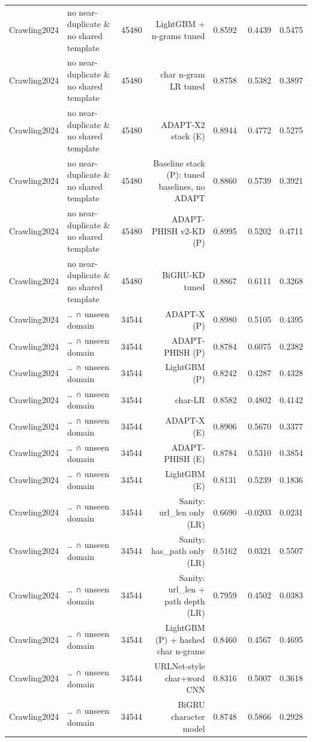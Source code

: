 \begin{table}[t]
\begin{tabular}{llrrrrr}
Crawling2024 & no near-duplicate \& no shared template & 45480 & LightGBM + n-grams tuned & 0.8592 & 0.4439 & 0.5475 \\
Crawling2024 & no near-duplicate \& no shared template & 45480 & char n-gram LR tuned & 0.8758 & 0.5382 & 0.3897 \\
Crawling2024 & no near-duplicate \& no shared template & 45480 & ADAPT-X2 stack (E) & 0.8944 & 0.4772 & 0.5275 \\
Crawling2024 & no near-duplicate \& no shared template & 45480 & Baseline stack (P): tuned baselines, no ADAPT & 0.8860 & 0.5739 & 0.3921 \\
Crawling2024 & no near-duplicate \& no shared template & 45480 & ADAPT-PHISH v2-KD (P) & 0.8995 & 0.5202 & 0.4711 \\
Crawling2024 & no near-duplicate \& no shared template & 45480 & BiGRU-KD tuned & 0.8867 & 0.6111 & 0.3268 \\
Crawling2024 & … ∩ unseen domain & 34544 & ADAPT-X (P) & 0.8980 & 0.5105 & 0.4395 \\
Crawling2024 & … ∩ unseen domain & 34544 & ADAPT-PHISH (P) & 0.8784 & 0.6075 & 0.2382 \\
Crawling2024 & … ∩ unseen domain & 34544 & LightGBM (P) & 0.8242 & 0.4287 & 0.4328 \\
Crawling2024 & … ∩ unseen domain & 34544 & char-LR & 0.8582 & 0.4802 & 0.4142 \\
Crawling2024 & … ∩ unseen domain & 34544 & ADAPT-X (E) & 0.8906 & 0.5670 & 0.3377 \\
Crawling2024 & … ∩ unseen domain & 34544 & ADAPT-PHISH (E) & 0.8784 & 0.5310 & 0.3854 \\
Crawling2024 & … ∩ unseen domain & 34544 & LightGBM (E) & 0.8131 & 0.5239 & 0.1836 \\
Crawling2024 & … ∩ unseen domain & 34544 & Sanity: url\_len only (LR) & 0.6690 & -0.0203 & 0.0231 \\
Crawling2024 & … ∩ unseen domain & 34544 & Sanity: has\_path only (LR) & 0.5162 & 0.0321 & 0.5507 \\
Crawling2024 & … ∩ unseen domain & 34544 & Sanity: url\_len + path depth (LR) & 0.7959 & 0.4502 & 0.0383 \\
Crawling2024 & … ∩ unseen domain & 34544 & LightGBM (P) + hashed char n-grams & 0.8460 & 0.4567 & 0.4695 \\
Crawling2024 & … ∩ unseen domain & 34544 & URLNet-style char+word CNN & 0.8316 & 0.5007 & 0.3618 \\
Crawling2024 & … ∩ unseen domain & 34544 & BiGRU character model & 0.8748 & 0.5866 & 0.2928 \\

\end{tabular}
\end{table}
